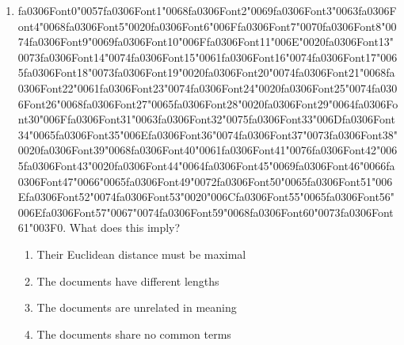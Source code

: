 \documentclass[12pt]{article}
\begin{document}
\begin{enumerate}[label=Q\arabic*.]
 \item {\csname fa0306Font0\endcsname\char"0057}{\csname fa0306Font1\endcsname\char"0068}{\csname fa0306Font2\endcsname\char"0069}{\csname fa0306Font3\endcsname\char"0063}{\csname fa0306Font4\endcsname\char"0068}{\csname fa0306Font5\endcsname\char"0020}{\csname fa0306Font6\endcsname\char"006F}{\csname fa0306Font7\endcsname\char"0070}{\csname fa0306Font8\endcsname\char"0074}{\csname fa0306Font9\endcsname\char"0069}{\csname fa0306Font10\endcsname\char"006F}{\csname fa0306Font11\endcsname\char"006E}{\char"0020}{\csname fa0306Font13\endcsname\char"0073}{\csname fa0306Font14\endcsname\char"0074}{\csname fa0306Font15\endcsname\char"0061}{\csname fa0306Font16\endcsname\char"0074}{\csname fa0306Font17\endcsname\char"0065}{\csname fa0306Font18\endcsname\char"0073}{\csname fa0306Font19\endcsname\char"0020}{\csname fa0306Font20\endcsname\char"0074}{\csname fa0306Font21\endcsname\char"0068}{\csname fa0306Font22\endcsname\char"0061}{\csname fa0306Font23\endcsname\char"0074}{\csname fa0306Font24\endcsname\char"0020}{\csname fa0306Font25\endcsname\char"0074}{\csname fa0306Font26\endcsname\char"0068}{\csname fa0306Font27\endcsname\char"0065}{\csname fa0306Font28\endcsname\char"0020}{\csname fa0306Font29\endcsname\char"0064}{\csname fa0306Font30\endcsname\char"006F}{\csname fa0306Font31\endcsname\char"0063}{\csname fa0306Font32\endcsname\char"0075}{\csname fa0306Font33\endcsname\char"006D}{\csname fa0306Font34\endcsname\char"0065}{\csname fa0306Font35\endcsname\char"006E}{\csname fa0306Font36\endcsname\char"0074}{\csname fa0306Font37\endcsname\char"0073}{\csname fa0306Font38\endcsname\char"0020}{\csname fa0306Font39\endcsname\char"0068}{\csname fa0306Font40\endcsname\char"0061}{\csname fa0306Font41\endcsname\char"0076}{\csname fa0306Font42\endcsname\char"0065}{\csname fa0306Font43\endcsname\char"0020}{\csname fa0306Font44\endcsname\char"0064}{\csname fa0306Font45\endcsname\char"0069}{\csname fa0306Font46\endcsname\char"0066}{\csname fa0306Font47\endcsname\char"0066}{\char"0065}{\csname fa0306Font49\endcsname\char"0072}{\csname fa0306Font50\endcsname\char"0065}{\csname fa0306Font51\endcsname\char"006E}{\csname fa0306Font52\endcsname\char"0074}{\csname fa0306Font53\endcsname\char"0020}{\char"006C}{\csname fa0306Font55\endcsname\char"0065}{\csname fa0306Font56\endcsname\char"006E}{\csname fa0306Font57\endcsname\char"0067}{\char"0074}{\csname fa0306Font59\endcsname\char"0068}{\csname fa0306Font60\endcsname\char"0073}{\csname fa0306Font61\endcsname\char"003F}$0$. What does this imply?
 \begin{enumerate}[label=(\Alph*)]
     \item Their Euclidean distance must be maximal
     \item The documents have different lengths
     \item The documents are unrelated in meaning
     \item The documents share no common terms
 \end{enumerate}
 

\end{enumerate}
\end{document}
